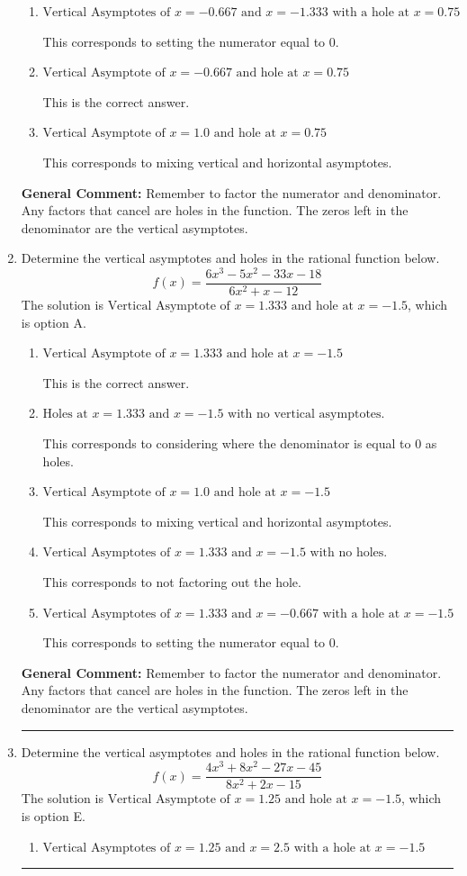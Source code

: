 \documentclass{extbook}[14pt]
\newcommand{\litem}[1]{\item #1

\rule{\textwidth}{0.4pt}}
\begin{document}
\begin{enumerate}
{\begin{enumerate}[label=\Alph*.]
This corresponds to not factoring out the hole.
\item \( \text{Vertical Asymptotes of } x = -0.667 \text{ and } x = -1.333 \text{ with a hole at } x = 0.75 \)

This corresponds to setting the numerator equal to 0.
\item \( \text{Vertical Asymptote of } x = -0.667 \text{ and hole at } x = 0.75 \)

This is the correct answer.
\item \( \text{Vertical Asymptote of } x = 1.0 \text{ and hole at } x = 0.75 \)

This corresponds to mixing vertical and horizontal asymptotes.
\end{enumerate}

\textbf{General Comment:} Remember to factor the numerator and denominator. Any factors that cancel are holes in the function. The zeros left in the denominator are the vertical asymptotes.
}
\litem{
Determine the vertical asymptotes and holes in the rational function below.
\[ f(x) = \frac{6x^{3} -5 x^{2} -33 x -18}{6x^{2} +x -12} \]The solution is \( \text{Vertical Asymptote of } x = 1.333 \text{ and hole at } x = -1.5 \), which is option A.\begin{enumerate}[label=\Alph*.]
\item \( \text{Vertical Asymptote of } x = 1.333 \text{ and hole at } x = -1.5 \)

This is the correct answer.
\item \( \text{Holes at } x = 1.333 \text{ and } x = -1.5 \text{ with no vertical asymptotes.} \)

This corresponds to considering where the denominator is equal to 0 as holes.
\item \( \text{Vertical Asymptote of } x = 1.0 \text{ and hole at } x = -1.5 \)

This corresponds to mixing vertical and horizontal asymptotes.
\item \( \text{Vertical Asymptotes of } x = 1.333 \text{ and } x = -1.5 \text{ with no holes.} \)

This corresponds to not factoring out the hole.
\item \( \text{Vertical Asymptotes of } x = 1.333 \text{ and } x = -0.667 \text{ with a hole at } x = -1.5 \)

This corresponds to setting the numerator equal to 0.
\end{enumerate}

\textbf{General Comment:} Remember to factor the numerator and denominator. Any factors that cancel are holes in the function. The zeros left in the denominator are the vertical asymptotes.
}
\litem{
Determine the vertical asymptotes and holes in the rational function below.
\[ f(x) = \frac{4x^{3} +8 x^{2} -27 x -45}{8x^{2} +2 x -15} \]The solution is \( \text{Vertical Asymptote of } x = 1.25 \text{ and hole at } x = -1.5 \), which is option E.\begin{enumerate}[label=\Alph*.]
\item \( \text{Vertical Asymptotes of } x = 1.25 \text{ and } x = 2.5 \text{ with a hole at } x = -1.5 \)


\end{enumerate}}
\end{enumerate}
\end{document}
